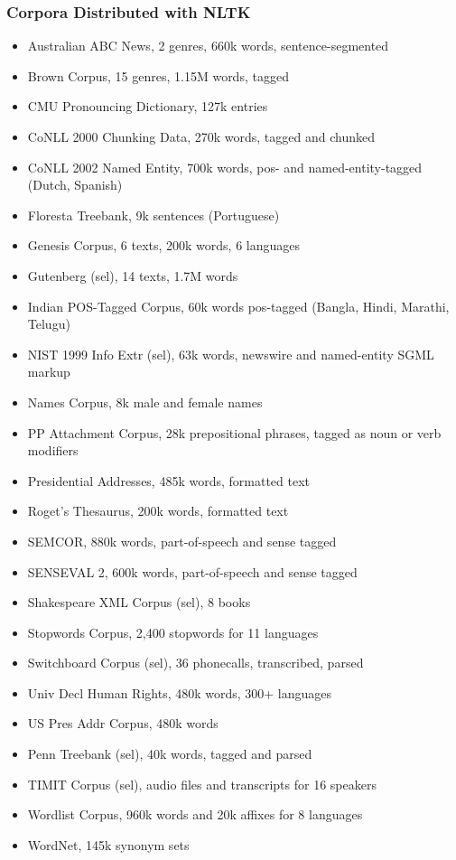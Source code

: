 \begin{frame}[fragile]\frametitle{Corpora Distributed with NLTK}
  \tiny
  \begin{itemize}
    \item Australian ABC News, 2 genres, 660k words, sentence-segmented
    \item Brown Corpus, 15 genres, 1.15M words, tagged
    \item CMU Pronouncing Dictionary, 127k entries
    \item CoNLL 2000 Chunking Data, 270k words, tagged and chunked
    \item CoNLL 2002 Named Entity, 700k words, pos- and named-entity-tagged (Dutch, Spanish)
    \item Floresta Treebank, 9k sentences (Portuguese)
    \item Genesis Corpus, 6 texts, 200k words, 6 languages
    \item Gutenberg (sel), 14 texts, 1.7M words
    \item Indian POS-Tagged Corpus, 60k words pos-tagged (Bangla, Hindi, Marathi, Telugu)
    \item NIST 1999 Info Extr (sel), 63k words, newswire and named-entity SGML markup
    \item Names Corpus, 8k male and female names
    \item PP Attachment Corpus, 28k prepositional phrases, tagged as noun or verb modifiers
    \item Presidential Addresses, 485k words, formatted text
    \item Roget's Thesaurus, 200k words, formatted text
    \item SEMCOR, 880k words, part-of-speech and sense tagged
    \item SENSEVAL 2, 600k words, part-of-speech and sense tagged
    \item Shakespeare XML Corpus (sel), 8 books
    \item Stopwords Corpus, 2,400 stopwords for 11 languages
    \item Switchboard Corpus (sel), 36 phonecalls, transcribed, parsed
    \item Univ Decl Human Rights, 480k words, 300+ languages
    \item US Pres Addr Corpus, 480k words
    \item Penn Treebank (sel), 40k words, tagged and parsed
    \item TIMIT Corpus (sel), audio files and transcripts for 16 speakers
    \item Wordlist Corpus, 960k words and 20k affixes for 8 languages
    \item WordNet, 145k synonym sets
  \end{itemize}
\end{frame}

